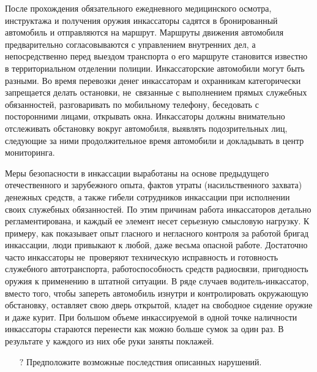 \documentclass[a4paper,12pt,fleqn]{article} %
\begin{document}
После прохождения обязательного ежедневного медицинского осмотра, инструктажа и получения оружия инкассаторы садятся в бронированный автомобиль и отправляются на маршрут. Маршруты движения автомобиля предварительно согласовываются с управлением внутренних дел, а непосредственно перед выездом транспорта о его маршруте становится известно в территориальном отделении полиции. Инкассаторские автомобили могут быть разными. Во время перевозки денег инкассаторам и охранникам категорически запрещается делать остановки, не~связанные с выполнением прямых служебных обязанностей, разговаривать по мобильному телефону, беседовать с посторонними лицами, открывать окна. Инкассаторы должны внимательно отслеживать обстановку вокруг автомобиля, выявлять подозрительных лиц, следующие за ними продолжительное время автомобили и докладывать в центр мониторинга.\\

\begin{tcolorbox}[colback=blue!55!red!5!,colframe=blue!55!red,enforce breakable,%
	pad at break=1mm, title=Кейс 34. Опасные типовые нарушения в инкассации]
	
	Меры безопасности в инкассации выработаны на основе предыдущего отечественного и зарубежного опыта, фактов утраты (насильственного захвата) денежных средств, а также гибели сотрудников инкассации при исполнении своих служебных обязанностей. По этим причинам работа инкассаторов детально регламентирована, и каждый ее элемент несет серьезную смысловую нагрузку. К примеру, как показывает опыт гласного и негласного контроля за работой бригад инкассации, люди привыкают к любой, даже весьма опасной работе. Достаточно часто инкассаторы не~проверяют техническую исправность и готовность служебного автотранспорта, работоспособность средств радиосвязи, пригодность оружия к применению в штатной ситуации. В ряде случаев водитель-инкассатор, вместо того, чтобы запереть автомобиль изнутри и контролировать окружающую обстановку, оставляет свою дверь открытой, кладет на свободное сидение оружие и даже курит. При большом объеме инкассируемой в одной точке наличности инкассаторы стараются перенести как можно больше сумок за один раз. В результате у каждого из них обе руки заняты поклажей. 
	
	\begin{itemize}
		\item[{\color{blue!55!red}\Huge {  $ ? $}} \quad]   Предположите возможные последствия описанных нарушений.
	\end{itemize}	
	
\end{tcolorbox}
\end{document}
